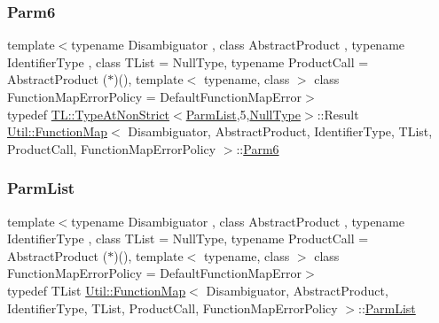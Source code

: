\subsubsection{\texorpdfstring{Parm6}{Parm6}\hspace{0.1cm}{\footnotesize\ttfamily [3/3]}}
{\footnotesize\ttfamily template$<$typename Disambiguator , class Abstract\+Product , typename Identifier\+Type , class T\+List  = Null\+Type, typename Product\+Call  = Abstract\+Product ($\ast$)(), template$<$ typename, class $>$ class Function\+Map\+Error\+Policy = Default\+Function\+Map\+Error$>$ \\
typedef \mbox{\hyperlink{structUtil_1_1TL_1_1TypeAtNonStrict}{T\+L\+::\+Type\+At\+Non\+Strict}}$<$\mbox{\hyperlink{classUtil_1_1FunctionMap_a6cf0e6766cf6f20642ba61c4994bb477}{Parm\+List}},5,\mbox{\hyperlink{classUtil_1_1NullType}{Null\+Type}}$>$\+::Result \mbox{\hyperlink{classUtil_1_1FunctionMap}{Util\+::\+Function\+Map}}$<$ Disambiguator, Abstract\+Product, Identifier\+Type, T\+List, Product\+Call, Function\+Map\+Error\+Policy $>$\+::\mbox{\hyperlink{classUtil_1_1FunctionMap_ae121f4a5c3534a888db59d6702a15b40}{Parm6}}}

\mbox{\label{classUtil_1_1FunctionMap_a6cf0e6766cf6f20642ba61c4994bb477}} 
\subsubsection{\texorpdfstring{ParmList}{ParmList}\hspace{0.1cm}{\footnotesize\ttfamily [1/3]}}
{\footnotesize\ttfamily template$<$typename Disambiguator , class Abstract\+Product , typename Identifier\+Type , class T\+List  = Null\+Type, typename Product\+Call  = Abstract\+Product ($\ast$)(), template$<$ typename, class $>$ class Function\+Map\+Error\+Policy = Default\+Function\+Map\+Error$>$ \\
typedef T\+List \mbox{\hyperlink{classUtil_1_1FunctionMap}{Util\+::\+Function\+Map}}$<$ Disambiguator, Abstract\+Product, Identifier\+Type, T\+List, Product\+Call, Function\+Map\+Error\+Policy $>$\+::\mbox{\hyperlink{classUtil_1_1FunctionMap_a6cf0e6766cf6f20642ba61c4994bb477}{Parm\+List}}}

